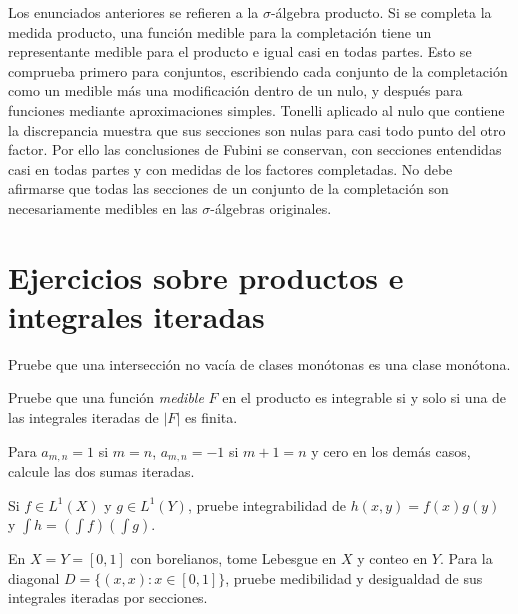\begin{observacion}
Los enunciados anteriores se refieren a la $\sigma$-álgebra producto. Si se completa la medida producto, una función medible para la completación tiene un representante medible para el producto e igual casi en todas partes. Esto se comprueba primero para conjuntos, escribiendo cada conjunto de la completación como un medible más una modificación dentro de un nulo, y después para funciones mediante aproximaciones simples. Tonelli aplicado al nulo que contiene la discrepancia muestra que sus secciones son nulas para casi todo punto del otro factor. Por ello las conclusiones de Fubini se conservan, con secciones entendidas casi en todas partes y con medidas de los factores completadas. No debe afirmarse que todas las secciones de un conjunto de la completación son necesariamente medibles en las $\sigma$-álgebras originales.
\end{observacion}

\section{Ejercicios sobre productos e integrales iteradas}
\begin{ejercicio}\label{ej:v2-l11-1}
Pruebe que una intersección no vacía de clases monótonas es una clase monótona.
\end{ejercicio}

\begin{ejercicio}\label{ej:v2-l11-2}
Pruebe que una función \emph{medible} $F$ en el producto es integrable si y solo si una de las integrales iteradas de $|F|$ es finita.
\end{ejercicio}

\begin{ejercicio}\label{ej:v2-l11-3}
Para $a_{m,n}=1$ si $m=n$, $a_{m,n}=-1$ si $m+1=n$ y cero en los demás casos, calcule las dos sumas iteradas.
\end{ejercicio}

\begin{ejercicio}\label{ej:v2-l11-4}
Si $f\in L^1(X)$ y $g\in L^1(Y)$, pruebe integrabilidad de $h(x,y)=f(x)g(y)$ y $\int h=(\int f)(\int g)$.
\end{ejercicio}

\begin{ejercicio}\label{ej:v2-l11-5}
En $X=Y=[0,1]$ con borelianos, tome Lebesgue en $X$ y conteo en $Y$. Para la diagonal $D=\{(x,x):x\in[0,1]\}$, pruebe medibilidad y desigualdad de sus integrales iteradas por secciones.
\end{ejercicio}

